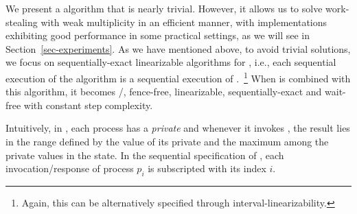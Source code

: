 We present a \RangeMaxReg algorithm that is nearly trivial. However, it allows us to solve work-stealing with weak multiplicity in an efficient manner, with implementations exhibiting good performance in some practical settings, as we will see in Section~\ref{sec-experiments}.  As we have mentioned above, to avoid trivial solutions, we focus on sequentially-exact linearizable algorithms for \RangeMaxReg, i.e., each sequential execution of the algorithm is a sequential execution of \MaxReg.~\footnote{Again, this can be alternatively specified through interval-linearizability.}  When \NCWSM is combined with this algorithm, it becomes \R/\W, fence-free, linearizable, sequentially-exact and wait-free with constant step complexity.

Intuitively, in \RangeMaxReg, each process has a \emph{private} \MaxReg and whenever it invokes \RMaxR, the result lies in the range defined by the value of its private \MaxReg and the maximum among the private {\MaxReg} values in the state.  In the sequential specification of \RangeMaxReg, each invocation/response of process $p_i$ is subscripted with its index $i$.




